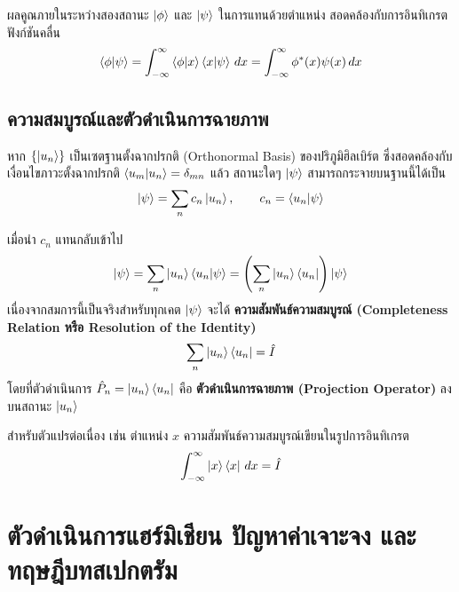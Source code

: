 ผลคูณภายในระหว่างสองสถานะ $\ket{\phi}$ และ $\ket{\psi}$ ในการแทนด้วยตำแหน่ง สอดคล้องกับการอินทิเกรตฟังก์ชันคลื่น
\begin{equation}
\braket{\phi}{\psi} = \int_{-\infty}^{\infty} \braket{\phi}{x}\braket{x}{\psi} \, dx = \int_{-\infty}^{\infty} \phi^*(x) \psi(x) \, dx
\end{equation}

\subsection{ความสมบูรณ์และตัวดำเนินการฉายภาพ}
หาก $\{ \ket{u_n} \}$ เป็นเซตฐานตั้งฉากปรกติ (Orthonormal Basis) ของปริภูมิฮิลเบิร์ต ซึ่งสอดคล้องกับเงื่อนไขภาวะตั้งฉากปรกติ $\braket{u_m}{u_n} = \delta_{mn}$ แล้ว สถานะใดๆ $\ket{\psi}$ สามารถกระจายบนฐานนี้ได้เป็น
\begin{equation}
\ket{\psi} = \sum_n c_n \ket{u_n}, \qquad c_n = \braket{u_n}{\psi}
\label{eq:basis_expansion}
\end{equation}

เมื่อนำ $c_n$ แทนกลับเข้าไป
\begin{equation}
\ket{\psi} = \sum_n \ket{u_n}\braket{u_n}{\psi} = \left( \sum_n \ket{u_n}\bra{u_n} \right) \ket{\psi}
\end{equation}
เนื่องจากสมการนี้เป็นจริงสำหรับทุกเคต $\ket{\psi}$ จะได้ \textbf{ความสัมพันธ์ความสมบูรณ์ (Completeness Relation หรือ Resolution of the Identity)}
\begin{equation}
\sum_n \ket{u_n}\bra{u_n} = \hat{I}
\label{eq:completeness_discrete}
\end{equation}
โดยที่ตัวดำเนินการ $\hat{P}_n = \ket{u_n}\bra{u_n}$ คือ \textbf{ตัวดำเนินการฉายภาพ (Projection Operator)} ลงบนสถานะ $\ket{u_n}$

สำหรับตัวแปรต่อเนื่อง เช่น ตำแหน่ง $x$ ความสัมพันธ์ความสมบูรณ์เขียนในรูปการอินทิเกรต
\begin{equation}
\int_{-\infty}^{\infty} \ket{x}\bra{x} \, dx = \hat{I}
\label{eq:completeness_continuous}
\end{equation}

\section{ตัวดำเนินการแฮร์มิเชียน ปัญหาค่าเจาะจง และทฤษฎีบทสเปกตรัม}

